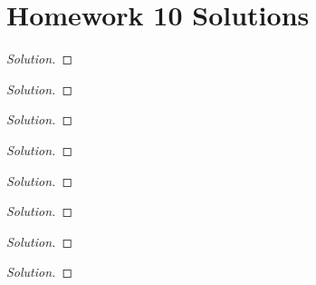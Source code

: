 \chapter{Homework 10 Solutions}
\begin{problem}
\end{problem}
\begin{proof}[Solution]
\end{proof}

\begin{problem}
\end{problem}
\begin{proof}[Solution]
\end{proof}

\begin{problem}
\end{problem}
\begin{proof}[Solution]
\end{proof}

\begin{problem}
\end{problem}
\begin{proof}[Solution]
\end{proof}

\begin{problem}
\end{problem}
\begin{proof}[Solution]
\end{proof}

\begin{problem}
\end{problem}
\begin{proof}[Solution]
\end{proof}

\begin{problem}
\end{problem}
\begin{proof}[Solution]
\end{proof}

\begin{problem}
\end{problem}
\begin{proof}[Solution]
\end{proof}

